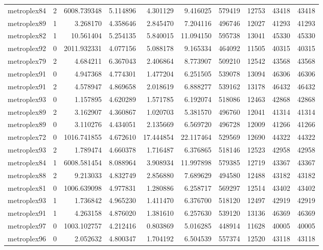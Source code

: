 \begin{longtable}{|l|r|r|r|r|r|r|r|r|r|}
metroplex84 & 2 & 6008.739348 & 5.114896 & 4.301129 & 9.416025 & 579419 & 12753 & 43418 & 43418 \\
metroplex89 & 1 & 3.268170 & 4.358646 & 2.845470 & 7.204116 & 496746 & 12027 & 41293 & 41293 \\
metroplex82 & 1 & 10.561404 & 5.254135 & 5.840015 & 11.094150 & 595738 & 13041 & 45330 & 45330 \\
metroplex92 & 0 & 2011.932331 & 4.077156 & 5.088178 & 9.165334 & 464092 & 11505 & 40315 & 40315 \\
metroplex79 & 2 & 4.684211 & 6.367043 & 2.406864 & 8.773907 & 509210 & 12542 & 43568 & 43568 \\
metroplex91 & 0 & 4.947368 & 4.774301 & 1.477204 & 6.251505 & 539078 & 13094 & 46306 & 46306 \\
metroplex91 & 2 & 4.578947 & 4.869658 & 2.018619 & 6.888277 & 539162 & 13178 & 46432 & 46432 \\
metroplex93 & 0 & 1.157895 & 4.620289 & 1.571785 & 6.192074 & 518086 & 12463 & 42868 & 42868 \\
metroplex89 & 2 & 3.162907 & 4.360867 & 1.020703 & 5.381570 & 496760 & 12041 & 41314 & 41314 \\
metroplex89 & 0 & 3.110276 & 4.434051 & 2.135669 & 6.569720 & 496728 & 12009 & 41266 & 41266 \\
metroplex72 & 0 & 1016.741855 & 4.672610 & 17.444854 & 22.117464 & 529569 & 12690 & 44322 & 44322 \\
metroplex93 & 2 & 1.789474 & 4.660378 & 1.716487 & 6.376865 & 518146 & 12523 & 42958 & 42958 \\
metroplex84 & 1 & 6008.581454 & 8.088964 & 3.908934 & 11.997898 & 579385 & 12719 & 43367 & 43367 \\
metroplex88 & 2 & 9.213033 & 4.832749 & 2.856880 & 7.689629 & 494580 & 12488 & 43182 & 43182 \\
metroplex81 & 0 & 1006.639098 & 4.977831 & 1.280886 & 6.258717 & 569297 & 12514 & 43402 & 43402 \\
metroplex93 & 1 & 1.736842 & 4.965230 & 1.411470 & 6.376700 & 518120 & 12497 & 42919 & 42919 \\
metroplex91 & 1 & 4.263158 & 4.876020 & 1.381610 & 6.257630 & 539120 & 13136 & 46369 & 46369 \\
metroplex97 & 0 & 1003.102757 & 4.212416 & 0.803869 & 5.016285 & 448914 & 11628 & 40005 & 40005 \\
metroplex96 & 0 & 2.052632 & 4.800347 & 1.704192 & 6.504539 & 557374 & 12520 & 43118 & 43118 \\

\end{longtable}
